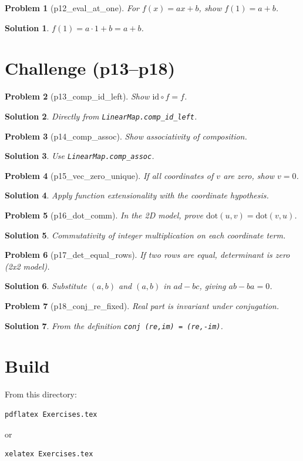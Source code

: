 \documentclass[11pt]{article}
\newtheorem*{problem}{Problem}
\newtheorem*{solution}{Solution}
\begin{document}
\begin{problem}[p12\_eval\_at\_one]
For $f(x)=ax+b$, show $f(1)=a+b$.
\end{problem}
\begin{solution}
$f(1)=a\cdot1+b=a+b$.
\end{solution}

\section*{Challenge (p13--p18)}

\begin{problem}[p13\_comp\_id\_left]
Show $\mathrm{id}\circ f=f$.
\end{problem}
\begin{solution}
Directly from \texttt{LinearMap.comp\_id\_left}.
\end{solution}

\begin{problem}[p14\_comp\_assoc]
Show associativity of composition.
\end{problem}
\begin{solution}
Use \texttt{LinearMap.comp\_assoc}.
\end{solution}

\begin{problem}[p15\_vec\_zero\_unique]
If all coordinates of $v$ are zero, show $v=0$.
\end{problem}
\begin{solution}
Apply function extensionality with the coordinate hypothesis.
\end{solution}

\begin{problem}[p16\_dot\_comm]
In the 2D model, prove $\mathrm{dot}(u,v)=\mathrm{dot}(v,u)$.
\end{problem}
\begin{solution}
Commutativity of integer multiplication on each coordinate term.
\end{solution}

\begin{problem}[p17\_det\_equal\_rows]
If two rows are equal, determinant is zero (2x2 model).
\end{problem}
\begin{solution}
Substitute $(a,b)$ and $(a,b)$ in $ad-bc$, giving $ab-ba=0$.
\end{solution}

\begin{problem}[p18\_conj\_re\_fixed]
Real part is invariant under conjugation.
\end{problem}
\begin{solution}
From the definition \texttt{conj (re,im) = (re,-im)}.
\end{solution}

\section*{Build}
From this directory:
\begin{verbatim}
pdflatex Exercises.tex
\end{verbatim}
or
\begin{verbatim}
xelatex Exercises.tex
\end{verbatim}
\end{document}
